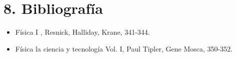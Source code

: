 \section{8. Bibliografía}
\begin{itemize}
  \item Física I , Resnick, Halliday, Krane, 341-344.
  \item Física la ciencia y tecnología Vol. I, Paul Tipler, Gene Mosca, 350-352.
\end{itemize}
